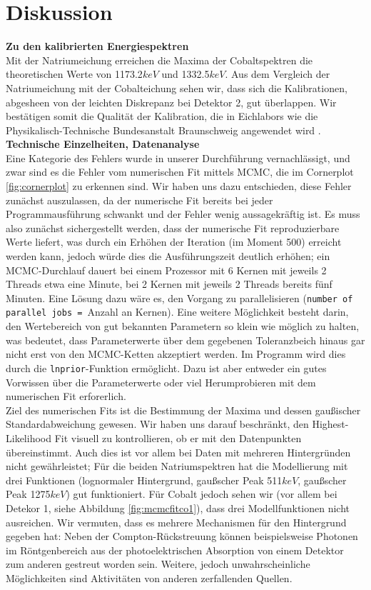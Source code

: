\documentclass[%
aps,
onecolumn,
11pt,
tightenlines,
nofootinbib,
superscriptaddress,
floatfix,
prd,
]{revtex4-2}
\begin{document}
\section{Diskussion}
\label{sec:Diskussion}
\textbf{Zu den kalibrierten Energiespektren}\\
Mit der Natriumeichung erreichen die Maxima der Cobaltspektren die theoretischen Werte von 1173.2$keV$ und 1332.5$keV$. Aus dem Vergleich der Natriumeichung mit der Cobalteichung sehen wir, dass sich die Kalibrationen, abgesheen von der leichten Diskrepanz bei Detektor 2, gut überlappen. Wir bestätigen somit die Qualität der Kalibration, die in Eichlabors wie die Physikalisch-Technische Bundesanstalt Braunschweig angewendet wird \cite{manual1}.\vspace{10pt}\\
\textbf{Technische Einzelheiten, Datenanalyse}\\
Eine Kategorie des Fehlers wurde in unserer Durchführung vernachlässigt, und zwar sind es die Fehler vom numerischen Fit mittels MCMC, die im Cornerplot \ref{fig:cornerplot} zu erkennen sind. Wir haben uns dazu entschieden, diese Fehler zunächst auszulassen, da der numerische Fit bereits bei jeder Programmausführung schwankt und der Fehler wenig aussagekräftig ist. Es muss also zunächst sichergestellt werden, dass der numerische Fit reproduzierbare Werte liefert, was durch ein Erhöhen der Iteration (im Moment 500) erreicht werden kann, jedoch würde dies die Ausführungszeit deutlich erhöhen; ein MCMC-Durchlauf dauert bei einem Prozessor mit 6 Kernen mit jeweils 2 Threads etwa eine Minute, bei 2 Kernen mit jeweils 2 Threads bereits fünf Minuten. Eine Lösung dazu wäre es, den Vorgang zu parallelisieren (\texttt{number of parallel jobs = }Anzahl an Kernen). Eine weitere Möglichkeit besteht darin, den Wertebereich von gut bekannten Parametern so klein wie möglich zu halten, was bedeutet, dass Parameterwerte über dem gegebenen Toleranzbeich hinaus gar nicht erst von den MCMC-Ketten akzeptiert werden. Im Programm wird dies durch die \texttt{lnprior}-Funktion ermöglicht. Dazu ist aber entweder ein gutes Vorwissen über die Parameterwerte oder viel Herumprobieren mit dem numerischen Fit erforerlich.\\
Ziel des numerischen Fits ist die Bestimmung der Maxima und dessen gaußischer Standardabweichung gewesen. Wir haben uns darauf beschränkt, den Highest-Likelihood Fit visuell zu kontrollieren, ob er mit den Datenpunkten übereinstimmt. Auch dies ist vor allem bei Daten mit mehreren Hintergründen nicht gewährleistet; Für die beiden Natriumspektren hat die Modellierung mit drei Funktionen (lognormaler Hintergrund, gaußscher Peak 511$keV$, gaußscher Peak 1275$keV$) gut funktioniert. Für Cobalt jedoch sehen wir (vor allem bei Detekor 1, siehe Abbildung \ref{fig:mcmcfitco1}), dass drei Modellfunktionen nicht ausreichen. Wir vermuten, dass es mehrere Mechanismen für den Hintergrund gegeben hat: Neben der Compton-Rückstreuung können beispielsweise Photonen im Röntgenbereich aus der photoelektrischen Absorption von einem Detektor zum anderen gestreut worden sein. Weitere, jedoch unwahrscheinliche Möglichkeiten sind Aktivitäten von anderen zerfallenden Quellen.\\
\end{document}
